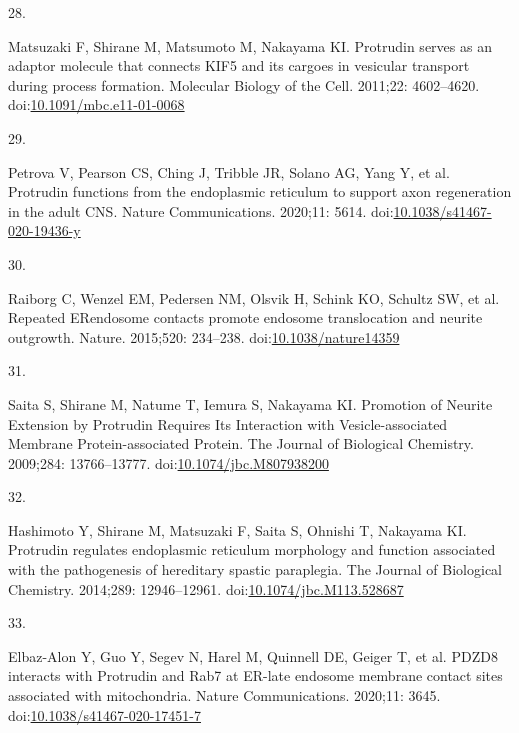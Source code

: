 \documentclass[
  12pt,
  a4paper,
]{book}
\newlength{\cslhangindent}
\newlength{\csllabelwidth}
\newlength{\cslentryspacingunit} %
\newenvironment{CSLReferences}[2] %
 {%
  \setlength{\parindent}{0pt}
  \ifodd #1
  \let\oldpar\par
  \def\par{\hangindent=\cslhangindent\oldpar}
  \fi
  \setlength{\parskip}{#2\cslentryspacingunit}
 }%
 {}
\newcommand{\CSLLeftMargin}[1]{\parbox[t]{\csllabelwidth}{#1}}
\newcommand{\CSLRightInline}[1]{\parbox[t]{\linewidth - \csllabelwidth}{#1}\break}
\begin{document}
\begin{CSLReferences}{0}{0}
\leavevmode{}%
\CSLLeftMargin{28. }%
\CSLRightInline{Matsuzaki F, Shirane M, Matsumoto M, Nakayama KI. Protrudin serves as an adaptor molecule that connects {KIF5} and its cargoes in vesicular transport during process formation. Molecular Biology of the Cell. 2011;22: 4602--4620. doi:\href{https://doi.org/10.1091/mbc.e11-01-0068}{10.1091/mbc.e11-01-0068}}

\leavevmode{}%
\CSLLeftMargin{29. }%
\CSLRightInline{Petrova V, Pearson CS, Ching J, Tribble JR, Solano AG, Yang Y, et al. Protrudin functions from the endoplasmic reticulum to support axon regeneration in the adult {CNS}. Nature Communications. 2020;11: 5614. doi:\href{https://doi.org/10.1038/s41467-020-19436-y}{10.1038/s41467-020-19436-y}}

\leavevmode{}%
\CSLLeftMargin{30. }%
\CSLRightInline{Raiborg C, Wenzel EM, Pedersen NM, Olsvik H, Schink KO, Schultz SW, et al. Repeated {ER}\textendash endosome contacts promote endosome translocation and neurite outgrowth. Nature. 2015;520: 234--238. doi:\href{https://doi.org/10.1038/nature14359}{10.1038/nature14359}}

\leavevmode{}%
\CSLLeftMargin{31. }%
\CSLRightInline{Saita S, Shirane M, Natume T, Iemura S, Nakayama KI. Promotion of {Neurite Extension} by {Protrudin Requires Its Interaction} with {Vesicle-associated Membrane Protein-associated Protein}. The Journal of Biological Chemistry. 2009;284: 13766--13777. doi:\href{https://doi.org/10.1074/jbc.M807938200}{10.1074/jbc.M807938200}}

\leavevmode{}%
\CSLLeftMargin{32. }%
\CSLRightInline{Hashimoto Y, Shirane M, Matsuzaki F, Saita S, Ohnishi T, Nakayama KI. Protrudin regulates endoplasmic reticulum morphology and function associated with the pathogenesis of hereditary spastic paraplegia. The Journal of Biological Chemistry. 2014;289: 12946--12961. doi:\href{https://doi.org/10.1074/jbc.M113.528687}{10.1074/jbc.M113.528687}}

\leavevmode{}%
\CSLLeftMargin{33. }%
\CSLRightInline{Elbaz-Alon Y, Guo Y, Segev N, Harel M, Quinnell DE, Geiger T, et al. {PDZD8} interacts with {Protrudin} and {Rab7} at {ER-late} endosome membrane contact sites associated with mitochondria. Nature Communications. 2020;11: 3645. doi:\href{https://doi.org/10.1038/s41467-020-17451-7}{10.1038/s41467-020-17451-7}}


\end{CSLReferences}
\end{document}
